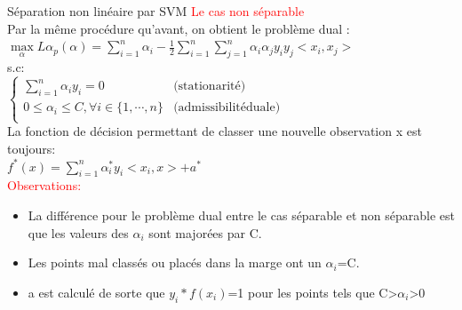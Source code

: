 \documentclass{bredelebeamer}
\begin{document}
\begin{frame}{Séparation non linéaire par SVM}
\textcolor{red}{Le cas non séparable}\vspace{1\baselineskip}\\
Par la même procédure qu’avant, on obtient le problème dual :\\
$\max\limits_{\alpha} L\alpha_p(\alpha) = \sum\limits_{i=1}^{n} \alpha_i -\frac{1}{2}\sum\limits_{i=1}^{n}\sum\limits_{j=1}^{n}\alpha_i\alpha_j y_i y_j <x_i,x_j>$\\
s.c:\\
$\left\{ \begin{array}{ll}
\sum\limits_{i=1}^{n} \alpha_i y_i =0 & \mbox{(stationarité)}\\
0 \leq \alpha_i \leq C, \forall i \in \{1, \cdots, n\} & \mbox{(admissibilitéduale)}\\
\end{array}\right.$\\
La fonction de décision permettant de classer une nouvelle observation x est toujours:\\
  $f^{*}(x)= \sum\limits_{i=1}^{n}\alpha_i^{*} y_i<x_i,x> +a^{*}$\\ 
  \textcolor{red}{Observations:}\\
      \begin{itemize}
      \item La différence pour le problème dual entre le cas séparable et non séparable est que les valeurs des $\alpha_i$ sont majorées par C.\\
      \item Les points mal classés ou placés dans la marge ont un $\alpha_i$=C.
      \item a est calculé de sorte que $y_i*f(x_i)$=1 pour  les points tels que C>$\alpha_i$>0

\end{itemize}
 
\end{frame}
\end{document}
